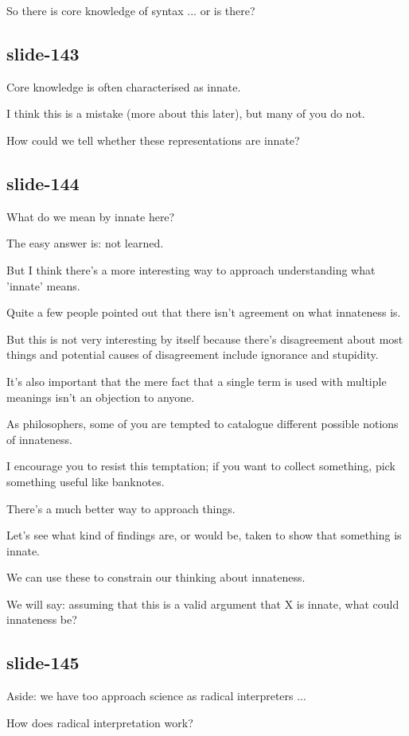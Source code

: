 \documentclass[12pt,\papersize]{extarticle}
\begin{document}
So there is core knowledge of syntax ... or is there?

\subsection{slide-143}
Core knowledge is often characterised as innate.

I think this is a mistake (more about this later), but many of you do not.

How could we tell whether these representations are innate?

\subsection{slide-144}
What do we mean by innate here?

The easy answer is: not learned.

But I think there's a more interesting way to approach understanding what 'innate' means.

Quite a few people pointed out that there isn't agreement on what innateness is.

But this is not very interesting by itself because there's disagreement about most things and potential causes of disagreement include ignorance and stupidity.

It's also important that the mere fact that a single term is used with multiple meanings isn't an objection to anyone.

As philosophers, some of you are tempted to catalogue different possible notions of innateness.

I encourage you to resist this temptation; if you want to collect something, pick something useful like banknotes.

There's a much better way to approach things.

Let's see what kind of findings are, or would be, taken to show that something is innate.

We can use these to constrain our thinking about innateness.

We will say: assuming that this is a valid argument that X is innate, what could innateness be?

\subsection{slide-145}
Aside: we have too approach science as radical interpreters ...

How does radical interpretation work?
\end{document}
